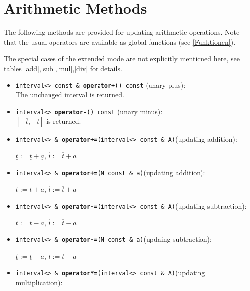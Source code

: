 \documentclass{report}
\begin{document}
	\section{Arithmetic Methods}
		The following methods are provided for updating arithmetic
		operations. Note that the usual operators are available as
		global functions (see \ref{Funktionen}).
		
		The special cases of the extended mode are not
		explicitly mentioned here, see tables \ref{add},\ref{sub},\ref{mul},\ref{div} for details.
		\begin{itemize}
		\item 
			\texttt{interval<> const \& {\bf operator+}() const} (unary plus):\\
			The unchanged interval is returned.
		\item
			\texttt{interval<> {\bf operator-}() const} (unary minus):\\
			 $[-\overline{t},-\underline{t}]$ is returned.
		\item
			\texttt{interval<> \& {\bf operator+=}(interval<>
		const \& A)}(updating addition):\\
			
			\begin{center}
				$\underline{t} := \underline{t}+\underline{a}$, $\overline{t} := \overline{t}+\overline{a}$
			\end{center}
		\item
			\texttt{interval<> \& {\bf operator+=}(N const \& a)}(updating addition):\\
			
			\begin{center}
				$\underline{t} := \underline{t}+a$,
				$\overline{t} := \overline{t}+a$
			\end{center}
		\item
			\texttt{interval<> \& {\bf operator-=}(interval<> const \& A)}(updating subtraction):\\

			\begin{center}
				$\underline{t} := \underline{t}-\overline{a}$,
				$\overline{t} := \overline{t}-\underline{a}$
			\end{center}
		\item
			\texttt{interval<> \& {\bf operator-=}(N const \& a)}(updaing subtraction):\\
		
			\begin{center}
				$\underline{t} := \underline{t}-a$,
				$\overline{t} := \overline{t}-a$
			\end{center}
		\item
			\texttt{interval<> \& {\bf operator*=}(interval<> const \& A)}(updating multiplication):\\
	

\end{itemize}
\end{document}
